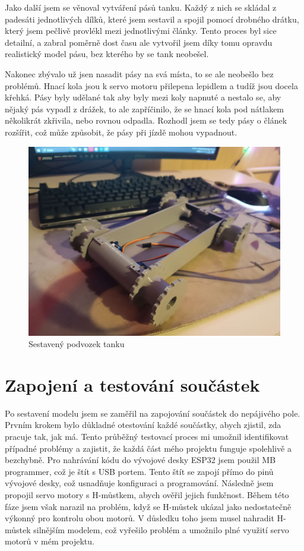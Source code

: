 \documentclass[12pt, a4paper,
oneside
openany
]{report}
\begin{document}
\noindent Jako další jsem se věnoval vytváření pásů tanku. Každý z nich se skládal z padesáti jednotlivých dílků, které jsem sestavil a spojil pomocí drobného drátku, který jsem pečlivě provlékl mezi jednotlivými články. Tento proces byl sice detailní, a zabral poměrně dost času ale vytvořil jsem díky tomu opravdu realistický model pásu, bez kterého by se tank neobešel.

\noindent Nakonec zbývalo už jsen nasadit pásy na svá místa, to se ale neobešlo bez problémů. Hnací kola jsou k servo motoru přilepena lepidlem a tudíž jsou docela křehká. Pásy byly udělané tak aby byly mezi koly napnuté a nestalo se, aby nějaký pás vypadl z drážek, to ale zapříčinilo, že se hnací kola pod nátlakem několikrát zkřivila, nebo rovnou odpadla. Rozhodl jsem se tedy pásy o článek rozšířit, což může způsobit, že pásy při jízdě mohou vypadnout.

	\begin{figure}[h]
		\centering 
		\includegraphics[width=1\textwidth]{image/sestava.jpg} %
		\caption{Sestavený podvozek tanku} 
	\end{figure}

\newpage
 \section{Zapojení a testování součástek}
 \noindent Po sestavení modelu jsem se zaměřil na zapojování součástek do nepájivého pole. Prvním krokem bylo důkladné otestování každé součástky, abych zjistil, zda pracuje tak, jak má. Tento průběžný testovací proces mi umožnil identifikovat případné problémy a zajistit, že každá část mého projektu funguje spolehlivě a bezchybně. Pro nahrávání kódu do vývojové desky ESP32 jsem použil MB programmer, což je štít s USB portem. Tento štít se zapojí přímo do pinů vývojové desky, což usnadňuje konfiguraci a programování. Následně jsem propojil servo motory s H-můstkem, abych ověřil jejich funkčnost. Během této fáze jsem však narazil na problém, když se H-můstek ukázal jako nedostatečně výkonný pro kontrolu obou motorů. V důsledku toho jsem musel nahradit H-můstek silnějším modelem, což vyřešilo problém a umožnilo plné využití servo motorů v mém projektu. 
\end{document}
